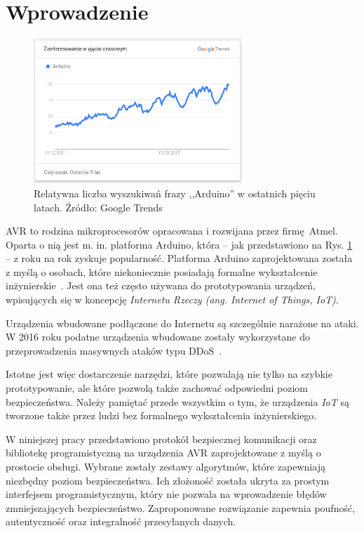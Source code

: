 \chapter*{Wprowadzenie}
\label{cha:wstep}


\begin{figure}[h]
\centering
\includegraphics[width=0.7\textwidth]{images/arduino-trends.png}
\caption{Relatywna liczba wyszukiwań frazy ,,Arduino'' w ostatnich pięciu latach. Źródło: Google Trends}
\label{fig:arduinotrends}
\end{figure}

AVR to rodzina mikroprocesorów opracowana i rozwijana przez firmę Atmel. Oparta o nią jest m. in. platforma Arduino, która -- jak przedstawiono na Rys. \ref{fig:arduinotrends} -- z roku na rok zyskuje popularność. Platforma Arduino zaprojektowana została z myślą o osobach, które niekoniecznie posiadają formalne wykształcenie inżynierskie~\cite{BanShi14}. Jest ona też często używana do prototypowania urządzeń, wpisujących się w koncepcję \emph{Internetu Rzeczy (ang. Internet of Things, IoT)}.

Urządzenia wbudowane podłączone do Internetu są szczególnie narażone na ataki. W 2016 roku podatne urządzenia wbudowane zostały wykorzystane do przeprowadzenia masywnych ataków typu DDoS~\cite{AkaIOT}.

Istotne jest więc dostarczenie narzędzi, które pozwalają nie tylko na szybkie prototypowanie, ale które pozwolą także zachować odpowiedni poziom bezpieczeństwa. Należy pamiętać przede wszystkim o tym, że urządzenia \emph{IoT} są tworzone także przez ludzi bez formalnego wykształcenia inżynierskiego.

W niniejszej pracy przedstawiono protokół bezpiecznej komunikacji oraz bibliotekę programistyczną na urządzenia AVR zaprojektowane z myślą o prostocie obsługi. Wybrane zostały zestawy algorytmów, które zapewniają niezbędny poziom bezpieczeństwa. Ich złożoność została ukryta za prostym interfejsem programistycznym, który nie pozwala na wprowadzenie błędów zmniejszających bezpieczeństwo.  Zaproponowane rozwiązanie zapewnia poufność, autentyczność oraz integralność przesyłanych danych.

